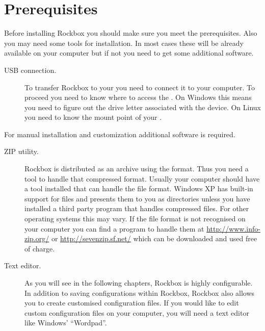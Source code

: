 \section{Prerequisites}\label{sec:prerequisites}
Before installing Rockbox you should make sure you meet the prerequisites.
Also you may need some tools for installation. In most cases these will be
already available on your computer but if not you need to get some additional
software.

\begin{description}
\item[USB connection.] To transfer Rockbox to your \dap{} you need to
  connect it to your computer. To proceed you need to know where to access the
  \dap{}. On Windows this means you need to figure out the drive letter
  associated with the device. On Linux you need to know the mount point of
  your \dap{}.


\end{description}
For manual installation and customization additional software is required.
\begin{description}
\item[ZIP utility.]
  Rockbox is distributed as an archive using the
   format. Thus you need a tool to handle that compressed
  format. Usually your computer should have a tool installed that can
  handle the  file format. Windows XP has built-in support for
   files and presents them to you as directories unless you have
  installed a third party program that handles compressed files. For
  other operating systems this may vary. If the  file format
  is not recognised on your computer you can find a program to handle them
  at \url{http://www.info-zip.org/} or \url{http://sevenzip.sf.net/} which
  can be downloaded and used free of charge.
\item[Text editor.] As you will see in the following chapters, Rockbox is
  highly configurable. In addition to saving configurations within Rockbox,
  Rockbox also allows you to create customised configuration files. If you
  would like to edit custom configuration files on your computer, you will
  need a text editor like Windows' ``Wordpad''.
\end{description}

